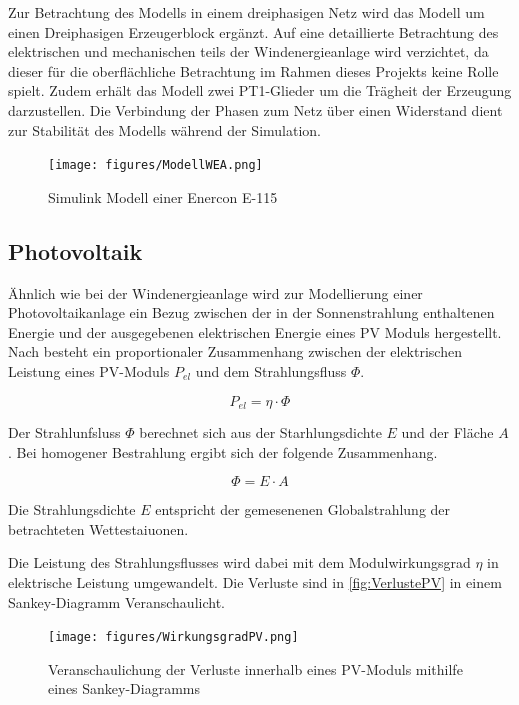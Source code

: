 Zur Betrachtung des Modells in einem dreiphasigen Netz wird das Modell um einen Dreiphasigen Erzeugerblock ergänzt. Auf eine detaillierte Betrachtung des elektrischen und mechanischen teils der Windenergieanlage wird verzichtet, da dieser für die oberflächliche Betrachtung im Rahmen dieses Projekts keine Rolle spielt. Zudem erhält das Modell zwei PT1-Glieder um die Trägheit der Erzeugung darzustellen. Die Verbindung der Phasen zum Netz über einen Widerstand dient zur Stabilität des Modells während der Simulation.

\begin{figure}[H]
	\centering
	\texttt{[image: figures/ModellWEA.png]}
	\caption{Simulink Modell einer Enercon E-115}
	\label{fig:e115}
\end{figure}

\subsection{Photovoltaik}

Ähnlich wie bei der Windenergieanlage wird zur Modellierung einer Photovoltaikanlage ein Bezug zwischen der in der Sonnenstrahlung enthaltenen Energie und der ausgegebenen elektrischen Energie eines PV Moduls hergestellt. Nach \cite{PV} besteht ein proportionaler Zusammenhang zwischen der elektrischen Leistung eines PV-Moduls $P_{el}$ und dem Strahlungsfluss $\Phi$. 

\begin{equation}
	P_{el} = \eta \cdot \Phi
\end{equation}

Der Strahlunfsluss $\Phi$ berechnet sich aus der Starhlungsdichte $E$ und der Fläche $A$. Bei homogener Bestrahlung ergibt sich der folgende Zusammenhang.

\begin{equation}
	\Phi = E \cdot A
\end{equation}

Die Strahlungsdichte $E$ entspricht der gemesenenen Globalstrahlung der betrachteten Wettestaiuonen.

Die Leistung des Strahlungsflusses wird dabei mit dem Modulwirkungsgrad $\eta$ in elektrische Leistung umgewandelt. Die Verluste sind in \autoref{fig:VerlustePV} in einem Sankey-Diagramm Veranschaulicht. 

\begin{figure}[H]
	\centering
	\texttt{[image: figures/WirkungsgradPV.png]}
	\caption{Veranschaulichung der Verluste innerhalb eines PV-Moduls mithilfe eines Sankey-Diagramms \cite{VerlustePV}}
	\label{fig:VerlustePV}
\end{figure}

